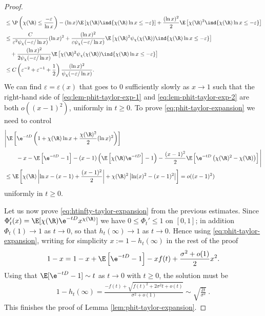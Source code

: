 \documentclass[10pt,a4paper]{article}
\begin{document}
\begin{proof}
\begin{align}
&\leq \P\left( \chi(\R) \leq \frac{-\varepsilon}{\ln x} \right) - (\ln x) \E\left[ \chi(\R)\ind{\chi(\R)\ln x \leq -\varepsilon} \right] + \frac{(\ln x)^2}{2} \E\left[ \chi(\R)^2 \ind{\chi(\R)\ln x \leq -\varepsilon} \right]  \nonumber \\
&\leq \frac{C}{\varepsilon^2 \psi_\chi(-\varepsilon/\ln x)} (\ln x)^2 + \frac{(\ln x)^2}{\varepsilon \psi_\chi(-\varepsilon/\ln x)} \E\left[ \chi(\R)^2 \psi_\chi(\chi(\R)) \ind{\chi(\R)\ln x \leq -\varepsilon} \right]  \nonumber \\
&\quad + \frac{(\ln x)^2}{2 \psi_\chi(-\varepsilon/\ln x)} \E\left[ \chi(\R)^2 \psi_\chi(\chi(\R)) \ind{\chi(\R)\ln x \leq -\varepsilon} \right] \nonumber \\
&\leq C\left( \varepsilon^{-2} + \varepsilon^{-1} + \frac 1 2 \right) \frac{(\ln x)^2}{\psi_\chi(-\varepsilon / \ln x)} .  \label{eq:lem-phit-taylor-exp-2}
\end{align}
We can find $\varepsilon = \varepsilon(x)$ that goes to $0$ sufficiently slowly as $x\to 1$ such that the right-hand side of \eqref{eq:lem-phit-taylor-exp-1} and \eqref{eq:lem-phit-taylor-exp-2} are both $o((x-1)^2)$, uniformly in $t\geq 0$. To prove \eqref{eq:phit-taylor-expansion} we need to control
\begin{align*}
&\Bigg| \E\left[ \e^{-tD}\left( 1 + \chi(\R) \ln x + \frac{\chi(\R)^2}{2} (\ln x)^2 \right) \right] \\
&\qquad - x - \E\left[ \e^{-tD}-1 \right] - (x-1) \left(\E\left[\chi(\R) \e^{-tD}\right]-1\right) - \frac{(x-1)^2}{2}\E\left[ \e^{-tD}\left( \chi(\R)^2 - \chi(\R)\right)\right] \Bigg| \\
&\leq \E\left[ \chi(\R) \left|\ln x - (x-1) + \frac{(x-1)^2}{2}\right| + \chi(\R)^2 \left|\ln(x)^2 - (x-1)^2\right| \right] = o((x-1)^2)
\end{align*}
uniformly in $t\geq 0$. 

Let us now prove \eqref{eq:htinfty-taylor-expansion} from the previous estimates. 
Since $\Phi_t'(x) = \E[\chi(\R) \e^{-t D} x^{\chi(\R)}]$ we have $0\leq \Phi_t'\leq 1$ on $[0,1]$; in addition $\Phi_t(1) \to 1$ as $t\to 0$, so that $h_t(\infty) \to 1$ as $t\to 0$. Hence using \eqref{eq:phit-taylor-expansion}, writing for simplicity $x := 1-h_t(\infty)$ in the rest of the proof
\begin{align*}
1-x = 1-x + \E\left[\e^{-tD}-1\right] - x f(t) + \frac{\sigma^2 + o(1)}{2} x^2 .
\end{align*}
Using that $\E[\e^{-tD}-1] \sim t$ as $t\to 0$ with $t\geq 0$, the solution must be
\begin{align*}
1-h_t(\infty) = \frac{-f(t) + \sqrt{f(t)^2 + 2 \sigma^2 t + o(t)}}{\sigma^2 + o(1)} \sim \sqrt{\frac{2 t}{\sigma^2}} \ .
\end{align*}
This finishes the proof of Lemma \ref{lem:phit-taylor-expansion}. 
\end{proof}
\end{document}

